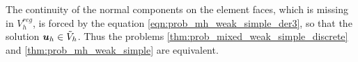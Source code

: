 
The continuity of the normal components on the element faces, which is missing in $V_h^{reg}$, is forced by the equation \eqref{eqn:prob_mh_weak_simple_der3},
so that the solution $\mathbf{\boldsymbol{u}}_h\in \tilde V_h$. Thus the problems \ref{thm:prob_mixed_weak_simple_discrete} and \ref{thm:prob_mh_weak_simple} are equivalent.

